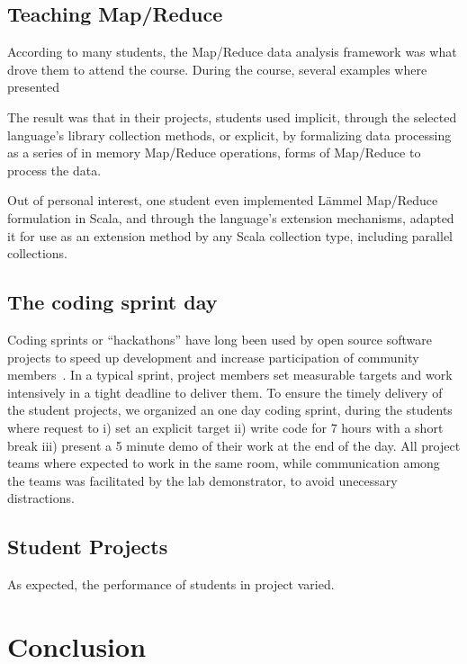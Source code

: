 \documentclass[conference]{IEEEtran}
\begin{document}
\subsection{Teaching Map/Reduce}

According to many students, the Map/Reduce data analysis framework was what
drove them to attend the course. During the course, several examples
where presented 

The result was that in their projects, students used implicit, through
the selected language's library collection methods, or explicit, by
formalizing data processing as a series of in memory Map/Reduce operations, forms
of Map/Reduce to process the data. 

Out of personal interest, one student even implemented L\"ammel Map/Reduce
formulation in Scala, and through the language's extension mechanisms,
adapted it for use as an extension method by any Scala collection type,
including parallel collections.

\subsection{The coding sprint day}

Coding sprints or ``hackathons'' have long been used by open source software
projects to speed up development and increase participation of community
members~\cite{Adams11}. In a typical sprint, project members set measurable
targets and work intensively in a tight deadline to deliver them. To ensure
the timely delivery of the student projects, we organized an one day
coding sprint, during the students where request to i) set an explicit target 
ii) write code for 7 hours with a short break iii) present a 5 minute 
demo of their work at the end of the day. All project teams where expected to
work in the same room, while communication among the teams was facilitated
by the lab demonstrator, to avoid unecessary distractions.



\subsection{Student Projects}

As expected, the performance of students in project varied. 

\section{Conclusion}
\end{document}

